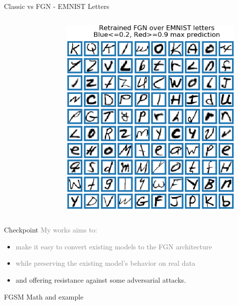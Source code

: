 \documentclass{beamer}
\begin{document}
\begin{frame}{Classic vs FGN - EMNIST Letters}
\begin{columns}
\begin{column}{.33\textwidth}
\begin{figure}
    \end{figure}
    \end{column}
    \begin{column}{.33\textwidth}
    \begin{figure}
        \centering
        \includegraphics[width=.85\textwidth]{images/Letters/retrained-letters.png}
    \end{figure}
    \end{column}
    \end{columns}
    
\end{frame}


\begin{frame}{Checkpoint}
\textcolor{gray}{My works aims to:}
\begin{itemize}
    \item \textcolor{gray}{make it easy to convert existing models to the FGN architecture}
    \item \textcolor{gray}{while preserving the existing model's behavior on real data}
    \item and offering resistance against some adversarial attacks.
\end{itemize}
    
\end{frame}


\begin{frame}{FGSM Math and example}
    
\end{frame}
\end{document}
